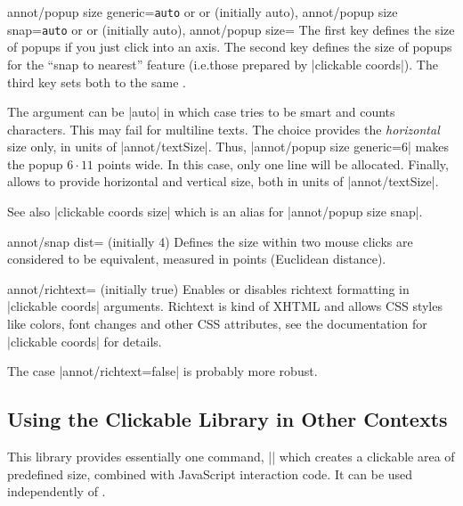\begin{pgfplotskeylist}{%
    annot/popup size generic=\texttt{auto} or  or  (initially auto),
    annot/popup size snap=\texttt{auto} or  or  (initially auto),
    annot/popup size=%
}
    The first key defines the size of popups if you just click into an axis.
    The second key defines the size of popups for the ``snap to nearest''
    feature (i.e.\@ those prepared by |clickable coords|). The third key sets
    both to the same .

    The argument can be |auto| in which case \PGFPlots{} tries to be smart and
    counts characters. This may fail for multiline texts. The choice 
    provides the \emph{horizontal} size only, in units of |annot/textSize|.
    Thus, |annot/popup size generic=6| makes the popup $6\cdot 11$ points wide.
    In this case, only one line will be allocated. Finally,  allows
    to provide horizontal and vertical size, both in units of |annot/textSize|.

    See also |clickable coords size| which is an alias for
    |annot/popup size snap|.
\end{pgfplotskeylist}

\begin{pgfplotskey}{annot/snap dist= (initially 4)}
    Defines the size within two mouse clicks are considered to be equivalent,
    measured in points (Euclidean distance).
\end{pgfplotskey}

\begin{pgfplotskey}{annot/richtext= (initially true)}
    Enables or disables richtext formatting in |clickable coords| arguments.
    Richtext is kind of XHTML and allows CSS styles like colors, font changes
    and other CSS attributes, see the documentation for |clickable coords| for
    details.

    The case |annot/richtext=false| is probably more robust.
\end{pgfplotskey}


\subsection{Using the Clickable Library in Other Contexts}

This library provides essentially one command, |\pgfplotsclickablecreate| which
creates a clickable area of predefined size, combined with JavaScript
interaction code. It can be used independently of \PGFPlots{}.

